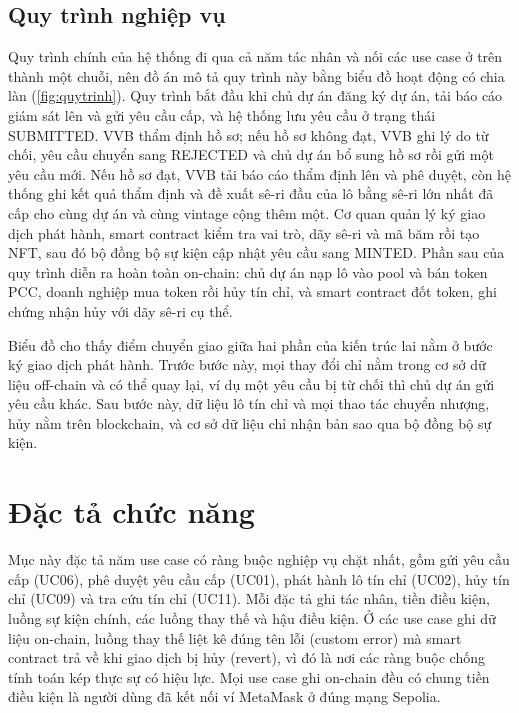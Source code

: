 \FloatBarrier
\subsection*{Quy trình nghiệp vụ}
\label{subsec:quytrinh}

Quy trình chính của hệ thống đi qua cả năm tác nhân và nối các use case ở trên thành một chuỗi, nên đồ án mô tả quy trình này bằng biểu đồ hoạt động có chia làn (\autoref{fig:quytrinh}). Quy trình bắt đầu khi chủ dự án đăng ký dự án, tải báo cáo giám sát lên và gửi yêu cầu cấp, và hệ thống lưu yêu cầu ở trạng thái SUBMITTED. VVB thẩm định hồ sơ; nếu hồ sơ không đạt, VVB ghi lý do từ chối, yêu cầu chuyển sang REJECTED và chủ dự án bổ sung hồ sơ rồi gửi một yêu cầu mới. Nếu hồ sơ đạt, VVB tải báo cáo thẩm định lên và phê duyệt, còn hệ thống ghi kết quả thẩm định và đề xuất sê-ri đầu của lô bằng sê-ri lớn nhất đã cấp cho cùng dự án và cùng vintage cộng thêm một. Cơ quan quản lý ký giao dịch phát hành, smart contract kiểm tra vai trò, dãy sê-ri và mã băm rồi tạo NFT, sau đó bộ đồng bộ sự kiện cập nhật yêu cầu sang MINTED. Phần sau của quy trình diễn ra hoàn toàn on-chain: chủ dự án nạp lô vào pool và bán token PCC, doanh nghiệp mua token rồi hủy tín chỉ, và smart contract đốt token, ghi chứng nhận hủy với dãy sê-ri cụ thể.

\HinhQuyTrinh

Biểu đồ cho thấy điểm chuyển giao giữa hai phần của kiến trúc lai nằm ở bước ký giao dịch phát hành. Trước bước này, mọi thay đổi chỉ nằm trong cơ sở dữ liệu off-chain và có thể quay lại, ví dụ một yêu cầu bị từ chối thì chủ dự án gửi yêu cầu khác. Sau bước này, dữ liệu lô tín chỉ và mọi thao tác chuyển nhượng, hủy nằm trên blockchain, và cơ sở dữ liệu chỉ nhận bản sao qua bộ đồng bộ sự kiện.

\section{Đặc tả chức năng}
\label{sec:dactachucnang}

Mục này đặc tả năm use case có ràng buộc nghiệp vụ chặt nhất, gồm gửi yêu cầu cấp (UC06), phê duyệt yêu cầu cấp (UC01), phát hành lô tín chỉ (UC02), hủy tín chỉ (UC09) và tra cứu tín chỉ (UC11). Mỗi đặc tả ghi tác nhân, tiền điều kiện, luồng sự kiện chính, các luồng thay thế và hậu điều kiện. Ở các use case ghi dữ liệu on-chain, luồng thay thế liệt kê đúng tên lỗi (custom error) mà smart contract trả về khi giao dịch bị hủy (revert), vì đó là nơi các ràng buộc chống tính toán kép thực sự có hiệu lực. Mọi use case ghi on-chain đều có chung tiền điều kiện là người dùng đã kết nối ví MetaMask ở đúng mạng Sepolia.

